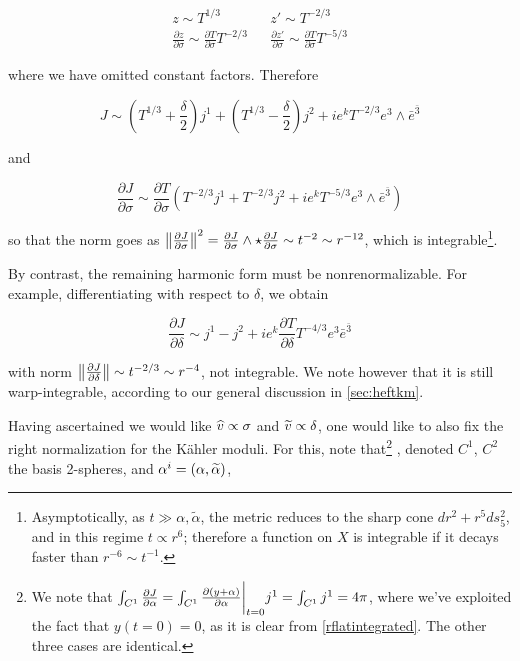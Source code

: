 \begin{align}
	z \sim T^{1/3} && z' \sim T^{-2/3}\\	
	\frac{\partial z}{\partial \sigma} \sim \frac{\partial T}{\partial \sigma} T^{-2/3} && \frac{\partial z'}{\partial \sigma} \sim \frac{\partial T}{\partial \sigma} T^{-5/3}
\end{align}

where we have omitted constant factors. Therefore

\begin{equation}
	J \sim \left(T^{1/3} + \frac{\delta}{2}\right) j^1 + \left(T^{1/3} - \frac{\delta}{2}\right)j^2 + ie^k T^{-2/3} e^3 \wedge \bar e^{\bar 3}
	\label{}
\end{equation}

and

\begin{equation}
	\frac{\partial J}{\partial \sigma} \sim \frac{\partial T}{\partial \sigma}\left( T^{-2/3} j^1 + T^{-2/3} j^2 + i e^k T^{-5/3}e^3 \wedge \bar e^{\bar 3} \right)
	\label{}
\end{equation}


so that the norm goes as $\left\Vert \frac{\partial J}{\partial\sigma} \right\Vert^2 = \frac{\partial J}{\partial\sigma} \wedge \star \frac{\partial J}{\partial\sigma} \sim t^{-2} \sim r^{-12}$, which is integrable\footnote{Asymptotically, as $t\gg \alpha,\tilde{\alpha}$, the metric reduces to the sharp cone $dr^2 + r^5 ds_5^2$, and in this regime $t \propto r^6$; therefore a function on $X$ is integrable if it decays faster than $r^{-6} \sim t^{-1}$.}.

By contrast, the remaining harmonic form must be nonrenormalizable. For example, differentiating with respect to $\delta$, we obtain

\begin{equation}
	\frac{\partial J}{\partial \delta} \sim j^1 - j^2 + ie^k \frac{\partial T}{\partial \delta} T^{-4/3} e^3 \bar e^{\bar 3}
	\label{}
\end{equation}

with norm $ \left\Vert \frac{\partial J}{\partial\delta} \right\Vert \sim t^{-2/3} \sim r^{-4}$, not integrable. We note however that it is still warp-integrable, according to our general discussion in \ref{sec:heftkm}.

Having ascertained we would like $\widehat{v} \propto \sigma$ and $\widetilde{v} \propto \delta$, one would like to also fix the right normalization for the K\"ahler moduli. For this, note that\footnote{We note that $	\int_{C^1} \frac{\partial J}{\partial\alpha} = \int_{C^1} \frac{\partial(y + \alpha)}{\partial\alpha}\bigg|_{t=0} j^1  = \int_{C^1} j^1 = 4\pi
	$, where we've exploited the fact that $y(t=0) = 0$, as it is clear from \eqref{rflatintegrated}. The other three cases are identical.} 
, denoted $C^1$, $C^2$ the basis 2-spheres, and $\alpha^i = (\alpha,\widetilde{\alpha})$,


